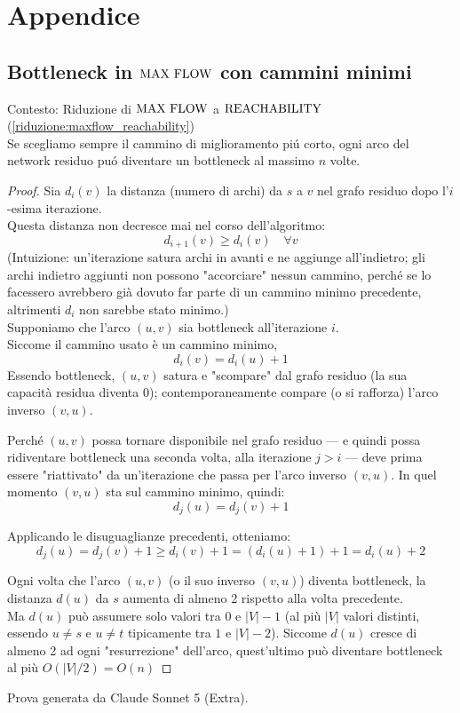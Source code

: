 \section*{Appendice}

\subsection*{Bottleneck in $\text{MAX FLOW}$ con cammini minimi}
\label{proof:bottleneck_in_max_flow}
Contesto: Riduzione di $\text{MAX FLOW}$ a $\text{REACHABILITY}$ (\ref{riduzione:maxflow_reachability})\\

Se scegliamo sempre il cammino di miglioramento piú corto, 
ogni arco del network residuo puó diventare un bottleneck al massimo $n$ volte.

\begin{proof}
Sia $d_i(v)$ la distanza (numero di archi) da $s$ a $v$ nel grafo residuo dopo l'$i$-esima iterazione. \\
Questa distanza non decresce mai nel corso dell'algoritmo:
$$d_{i+1}(v) \geq d_i(v) \quad \forall v$$
(Intuizione: un'iterazione satura archi in avanti e ne aggiunge all'indietro; 
gli archi indietro aggiunti non possono "accorciare" nessun cammino, 
perché se lo facessero avrebbero già dovuto far parte di un cammino minimo precedente,
altrimenti $d_i$ non sarebbe stato minimo.) \\


Supponiamo che l'arco $(u,v)$ sia bottleneck all'iterazione $i$. \\
Siccome il cammino usato è un cammino minimo,
$$d_i(v) = d_i(u) + 1$$
Essendo bottleneck, $(u,v)$ satura e "scompare" dal grafo residuo (la sua capacità residua diventa 0); 
contemporaneamente compare (o si rafforza) l'arco inverso $(v,u)$.

Perché $(u,v)$ possa tornare disponibile nel grafo residuo — 
e quindi possa ridiventare bottleneck una seconda volta, alla iterazione $j > i$ — 
deve prima essere "riattivato" da un'iterazione che passa per l'arco inverso $(v,u)$. 
In quel momento $(v,u)$ sta sul cammino minimo, quindi:
$$d_j(u) = d_j(v) + 1$$

Applicando le disuguaglianze precedenti, otteniamo:
$$d_j(u) = d_j(v) + 1 \geq d_i(v) + 1 = (d_i(u)+1) + 1 = d_i(u) + 2$$


Ogni volta che l'arco $(u,v)$ (o il suo inverso $(v,u)$) diventa bottleneck, 
la distanza $d(u)$ da $s$ aumenta di almeno 2 rispetto alla volta precedente. \\

Ma $d(u)$ può assumere solo valori tra $0$ e $|V|-1$ 
(al più $|V|$ valori distinti, essendo $u \neq s$ e $u \neq t$ tipicamente tra $1$ e $|V|-2$). 
Siccome $d(u)$ cresce di almeno 2 ad ogni "resurrezione" dell'arco, 
quest'ultimo può diventare bottleneck al più
$O(|V|/2) = O(n)$
\end{proof}
Prova generata da Claude Sonnet 5 (Extra).



